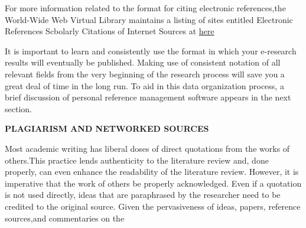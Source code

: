 \documentclass{article}
\begin{document}
For more information related to the format for citing electronic references,the World-Wide Web Virtual Library maintains a listing of sites entitled Electronic References Scbolarly Citations of Internet Sources at 
\href{http://www.spaceless.com/WWWVL/.}{here}

It is important to learn and consistently use the format in which your e-research results will eventually be published. Making use of consistent notation of all relevant fields from the very beginning of the research process will save you a great deal of time
in the long run. To aid in this data organization process, a brief discussion of personal reference management software appears in the next section.

\vspace{5mm}
\hspace{-2cm}
\textbf{PLAGIARISM AND NETWORKED SOURCES}
\vspace{3mm}

Most academic writing has liberal doses of direct quotations from the works of others.This practice lends authenticity to the literature review and, done properly, can even
enhance the readability of the literature review. However, it is imperative that the work of others be properly acknowledged. Even if a quotation is not used directly,
ideas that are paraphrased by the researcher need to be credited to the original source. Given the pervasiveness of ideas, papers, reference sources,and commentaries on the
\end{document}

